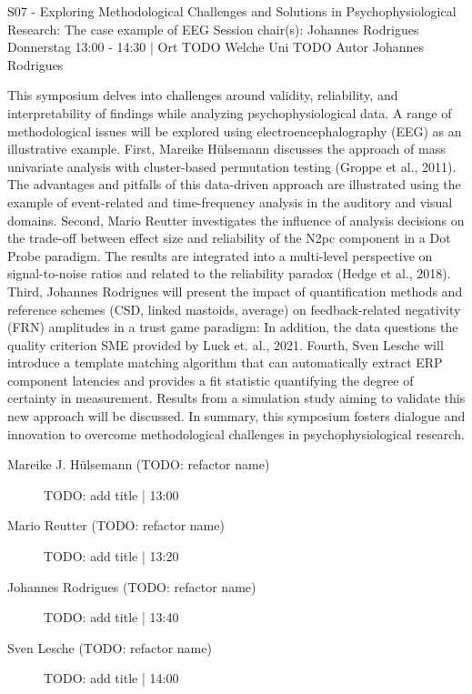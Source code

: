 
            \begin{symposium}
            {S07 - Exploring Methodological Challenges and Solutions in Psychophysiological Research: The case example of EEG}
            {Session chair(s): Johannes Rodrigues}
            {Donnerstag 13:00 - 14:30 | Ort TODO}
            {Welche Uni TODO}
            Autor Johannes Rodrigues

This symposium delves into challenges around validity, reliability, and interpretability of findings while analyzing psychophysiological data. A range of methodological issues will be explored using electroencephalography (EEG) as an illustrative example.
First, Mareike Hülsemann discusses the approach of mass univariate analysis with cluster-based permutation testing (Groppe et al., 2011). The advantages and pitfalls of this data-driven approach are illustrated using the example of event-related and time-frequency analysis in the auditory and visual domains.
Second, Mario Reutter investigates the influence of analysis decisions on the trade-off between effect size and reliability of the N2pc component in a Dot Probe paradigm. The results are integrated into a multi-level perspective on signal-to-noise ratios and related to the reliability paradox (Hedge et al., 2018).
Third, Johannes Rodrigues will present the impact of quantification methods and reference schemes (CSD, linked mastoids, average) on feedback-related negativity (FRN) amplitudes in a trust game paradigm: In addition, the data questions the quality criterion SME provided by Luck et. al., 2021.
Fourth, Sven Lesche will introduce a template matching algorithm that can automatically extract ERP component latencies and provides a fit statistic quantifying the degree of certainty in measurement. Results from a simulation study aiming to validate this new approach will be discussed.
In summary, this symposium fosters dialogue and innovation to overcome methodological challenges in psychophysiological research.
            \begin{description}    
            
                \item [Mareike J. Hülsemann (TODO: refactor name)] TODO: add title \textcolor{mygray}{ | 13:00}    
                
                \item [Mario Reutter (TODO: refactor name)] TODO: add title \textcolor{mygray}{ | 13:20}    
                
                \item [Johannes Rodrigues (TODO: refactor name)] TODO: add title \textcolor{mygray}{ | 13:40}    
                
                \item [Sven Lesche  (TODO: refactor name)] TODO: add title \textcolor{mygray}{ | 14:00}    
                
            \end{description} 
            \end{symposium}
            